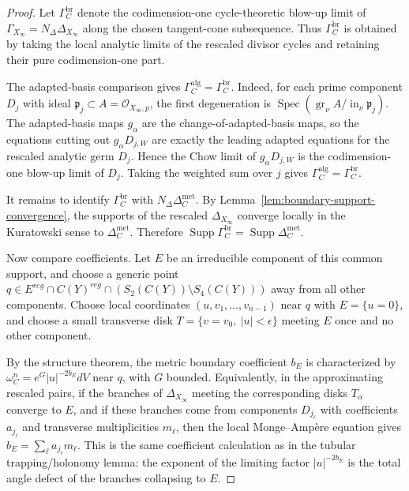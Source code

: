 \documentclass[10pt,a4paper]{amsart}
\begin{document}
\begin{proof}
Let $\Gamma_C^{\mathrm{br}}$ denote the codimension-one cycle-theoretic blow-up
limit of $\Gamma_{X_\infty}=N_\Delta\Delta_{X_\infty}$ along the chosen
tangent-cone subsequence. Thus $\Gamma_C^{\mathrm{br}}$ is obtained by taking
the local analytic limits of the rescaled divisor cycles and retaining their
pure codimension-one part.

The adapted-basis comparison gives
$\Gamma_C^{\mathrm{alg}}=\Gamma_C^{\mathrm{br}}$. Indeed, for each prime
component $D_j$ with ideal $\mathfrak p_j\subset A=\mathcal O_{X_\infty,p}$, the
first degeneration is
$\operatorname{Spec}(\operatorname{gr}_\nu A/\operatorname{in}_\nu\mathfrak p_j)$.
The adapted-basis maps $g_\alpha$ are the change-of-adapted-basis maps, so the equations
cutting out $g_\alpha D_{j,W}$ are exactly the leading adapted equations for
the rescaled analytic germ $D_j$. Hence the Chow limit of $g_\alpha D_{j,W}$ is
the codimension-one blow-up limit of $D_j$. Taking the weighted sum over $j$
gives $\Gamma_C^{\mathrm{alg}}=\Gamma_C^{\mathrm{br}}$.

It remains to identify $\Gamma_C^{\mathrm{br}}$ with
$N_\Delta\Delta_C^{\mathrm{met}}$. By
Lemma~\ref{lem:boundary-support-convergence}, the supports of the rescaled
$\Delta_{X_\infty}$ converge locally in the Kuratowski sense to
$\Delta_C^{\mathrm{met}}$. Therefore
$\operatorname{Supp}\Gamma_C^{\mathrm{br}}=\operatorname{Supp}\Delta_C^{\mathrm{met}}$.

Now compare coefficients. Let $E$ be an irreducible component of this common
support, and choose a generic point
$q\in E^{reg}\cap C(Y)^{reg}\cap(S_2(C(Y))\setminus S_4(C(Y)))$
away from all other components. Choose local coordinates
$(u,v_1,\dots,v_{n-1})$ near $q$ with $E=\{u=0\}$, and choose a small transverse
disk $T=\{v=v_0,\ |u|<\epsilon\}$ meeting $E$ once and no other component.

By the structure theorem, the metric boundary coefficient $b_E$ is characterized
by
$\omega_C^n=e^G|u|^{-2b_E}dV$ near $q$, with $G$ bounded. Equivalently, in the
approximating rescaled pairs, if the branches of
$\Delta_{X_\infty}$ meeting the corresponding disks $T_\alpha$ converge to
$E$, and if these branches come from components $D_{j_\ell}$ with coefficients
$a_{j_\ell}$ and transverse multiplicities $m_\ell$, then the local
Monge--Amp\`ere equation gives
$b_E=\sum_\ell a_{j_\ell}m_\ell$.
This is the same coefficient calculation as in the tubular trapping/holonomy
lemma: the exponent of the limiting factor $|u|^{-2b_E}$ is the total angle
defect of the branches collapsing to $E$.


\end{proof}
\end{document}
